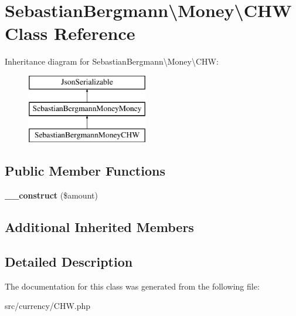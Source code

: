 \hypertarget{classSebastianBergmann_1_1Money_1_1CHW}{}\section{Sebastian\+Bergmann\textbackslash{}Money\textbackslash{}C\+H\+W Class Reference}
\label{classSebastianBergmann_1_1Money_1_1CHW}
Inheritance diagram for Sebastian\+Bergmann\textbackslash{}Money\textbackslash{}C\+H\+W\+:\begin{figure}[H]
\begin{center}
\leavevmode
\includegraphics[height=3.000000cm]{classSebastianBergmann_1_1Money_1_1CHW}
\end{center}
\end{figure}
\subsection*{Public Member Functions}
\begin{DoxyCompactItemize}
\item 
\hypertarget{classSebastianBergmann_1_1Money_1_1CHW_a250b7398aa6b854c3803394ab2e68f69}{}{\bfseries \+\_\+\+\_\+construct} (\$amount)\label{classSebastianBergmann_1_1Money_1_1CHW_a250b7398aa6b854c3803394ab2e68f69}

\end{DoxyCompactItemize}
\subsection*{Additional Inherited Members}


\subsection{Detailed Description}


The documentation for this class was generated from the following file\+:\begin{DoxyCompactItemize}
\item 
src/currency/C\+H\+W.\+php\end{DoxyCompactItemize}
